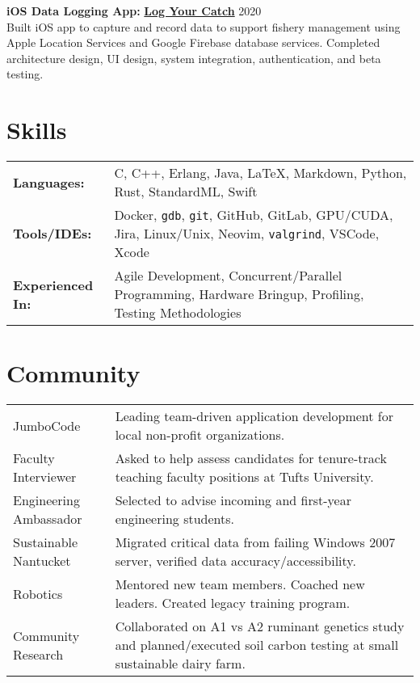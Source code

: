 \documentclass[letter,10pt]{article}
\begin{document}
\begin{minipage}[t]{\linewidth}
    \textbf{iOS Data Logging App:} \href{https://github.com/bstrand42/Log-Your-Catch}{\textbf{Log Your Catch}} \hfill 2020 \\
    Built iOS app to capture and record data to support fishery management using Apple Location Services and Google Firebase database services. Completed architecture design, UI design, system integration, authentication, and beta testing.
\end{minipage}

\section{Skills}
\begin{tabularx}{\linewidth}{@{}l X@{}}
    \textbf{Languages:} & C, C++, Erlang, Java, \LaTeX, Markdown, Python, Rust, StandardML, Swift \\
    \textbf{Tools/IDEs:} & Docker, \texttt{gdb}, \texttt{git}, GitHub, GitLab, GPU/CUDA, Jira, Linux/Unix, Neovim, \texttt{valgrind}, VSCode, Xcode \\
    \textbf{Experienced In:} & Agile Development, Concurrent/Parallel Programming, Hardware Bringup, Profiling, Testing Methodologies
\end{tabularx}

\section{Community}
\begin{tabularx}{\linewidth}{@{}l X@{}}	
    JumboCode & Leading team-driven application development for local non-profit organizations. \\[2.75pt]
    Faculty Interviewer & Asked to help assess candidates for tenure-track teaching faculty positions at Tufts University. \\[2.75pt]
    Engineering Ambassador & Selected to advise incoming and first-year engineering students. \\[2.75pt]
    Sustainable Nantucket & Migrated critical data from failing Windows 2007 server, verified data accuracy/accessibility. \\[2.75pt]
    Robotics & Mentored new team members. Coached new leaders. Created legacy training program. \\[2.75pt]
    Community Research & Collaborated on A1 vs A2 ruminant genetics study and planned/executed soil carbon testing at small sustainable dairy farm.
\end{tabularx}
\end{document}
